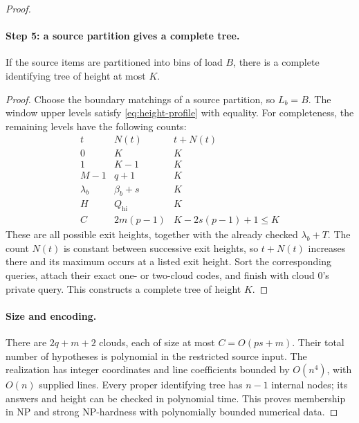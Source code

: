 \begin{proof}
\paragraph{Step 5: a source partition gives a complete tree.}
\begin{claim}
If the source items are partitioned into bins of load $B$, there is
a complete identifying tree of height at most $K$.
\end{claim}
\begin{proof}
Choose the boundary matchings of a source partition, so $L_b=B$.
The window upper levels satisfy \eqref{eq:height-profile} with equality.
For completeness, the remaining levels have the following counts:
\[
 \begin{array}{c|c|c}
 t&N(t)&t+N(t)\\ \hline
 0&K&K\\
 1&K-1&K\\
 M-1&q+1&K\\
 \lambda_b&\beta_b+s&K\\
 H&Q_{\mathrm{hi}}&K\\
 C&2m(p-1)&K-2s(p-1)+1\le K
 \end{array}
\]
These are all possible exit heights, together with the already
checked $\lambda_b+T$. The count $N(t)$ is constant between
successive exit heights, so $t+N(t)$ increases there and its maximum
occurs at a listed exit height. Sort the corresponding queries, attach
their exact one- or two-cloud codes, and finish with cloud $0$'s
private query. This constructs a complete tree of height $K$.
\end{proof}

\paragraph{Size and encoding.}
There are $2q+m+2$ clouds, each of size at most
$C=O(ps+m)$. Their total number of hypotheses is polynomial in
the restricted source input. The realization has integer coordinates
and line coefficients bounded by $O(n^4)$, with $O(n)$ supplied
lines. Every proper identifying tree has $n-1$ internal nodes;
its answers and height can be checked in polynomial time.
This proves membership in NP and strong NP-hardness with
polynomially bounded numerical data.
\end{proof}

